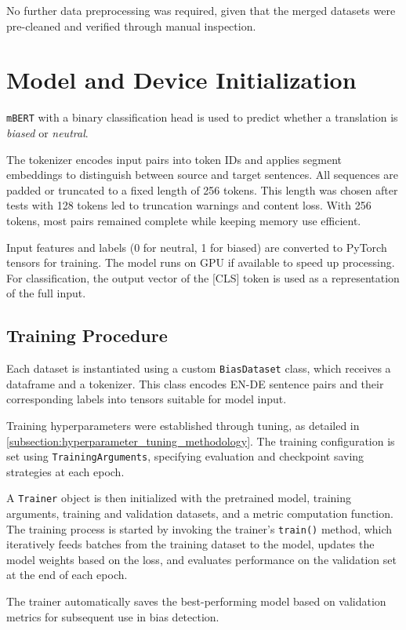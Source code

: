     No further data preprocessing was required, given that the merged datasets were pre-cleaned and verified through manual inspection.

\section{Model and Device Initialization}
    \texttt{mBERT} with a binary classification head is used to predict whether a translation is \textit{biased} or \textit{neutral}.

    The tokenizer encodes input pairs into token IDs and applies segment embeddings to distinguish between source and target sentences. All sequences are padded or truncated to a fixed length of 256 tokens. This length was chosen after tests with 128 tokens led to truncation warnings and content loss. With 256 tokens, most pairs remained complete while keeping memory use efficient.

    Input features and labels (0 for neutral, 1 for biased) are converted to PyTorch tensors for training. The model runs on GPU if available to speed up processing. For classification, the output vector of the [CLS] token is used as a representation of the full input.

\subsection{Training Procedure}
    Each dataset is instantiated using a custom \texttt{BiasDataset} class, which receives a dataframe and a tokenizer. This class encodes EN-DE sentence pairs and their corresponding labels into tensors suitable for model input.

    Training hyperparameters were established through tuning, as detailed in \autoref{subsection:hyperparameter_tuning_methodology}. The training configuration is set using \texttt{TrainingArguments}, specifying evaluation and checkpoint saving strategies at each epoch.

    A \texttt{Trainer} object is then initialized with the pretrained model, training arguments, training and validation datasets, and a metric computation function. The training process is started by invoking the trainer's \texttt{train()} method, which iteratively feeds batches from the training dataset to the model, updates the model weights based on the loss, and evaluates performance on the validation set at the end of each epoch.

    The trainer automatically saves the best-performing model based on validation metrics for subsequent use in bias detection.

